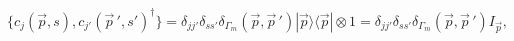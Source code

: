 \begin{equation}
\big\{c_j(\vec p,s),c_{j'}(\vec p\,',s')^{\dag}\big\}
=
\delta_{jj'}\delta_{ss'}\delta_{\Gamma_m}(\vec p,\vec p\,')
|\vec p\rangle\langle \vec p|\otimes 1
=
\delta_{jj'}\delta_{ss'}\delta_{\Gamma_m}(\vec p,\vec p\,')
I_{\vec p},\label{nCAR}
\end{equation}

